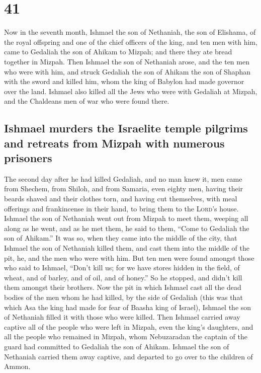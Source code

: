 \hypertarget{section-40}{%
\section{41}\label{section-40}}

 Now in the seventh month, Ishmael the son of Nethaniah,
the son of Elishama, of the royal offspring and one of the chief
officers of the king, and ten men with him, came to Gedaliah the son of
Ahikam to Mizpah; and there they ate bread together in Mizpah.
 Then Ishmael the son of Nethaniah arose, and the ten men
who were with him, and struck Gedaliah the son of Ahikam the son of
Shaphan with the sword and killed him, whom the king of Babylon had made
governor over the land.  Ishmael also killed all the Jews
who were with Gedaliah at Mizpah, and the Chaldeans men of war who were
found there.

\hypertarget{ishmael-murders-the-israelite-temple-pilgrims-and-retreats-from-mizpah-with-numerous-prisoners}{%
\subsection{Ishmael murders the Israelite temple pilgrims and retreats
from Mizpah with numerous
prisoners}\label{ishmael-murders-the-israelite-temple-pilgrims-and-retreats-from-mizpah-with-numerous-prisoners}}

 The second day after he had killed Gedaliah, and no man
knew it,  men came from Shechem, from Shiloh, and from
Samaria, even eighty men, having their beards shaved and their clothes
torn, and having cut themselves, with meal offerings and frankincense in
their hand, to bring them to the \textsc{Lord}'s house. 
Ishmael the son of Nethaniah went out from Mizpah to meet them, weeping
all along as he went, and as he met them, he said to them, ``Come to
Gedaliah the son of Ahikam.''  It was so, when they came
into the middle of the city, that Ishmael the son of Nethaniah killed
them, and cast them into the middle of the pit, he, and the men who were
with him.  But ten men were found amongst those who said
to Ishmael, ``Don't kill us; for we have stores hidden in the field, of
wheat, and of barley, and of oil, and of honey.'' So he stopped, and
didn't kill them amongst their brothers.  Now the pit in
which Ishmael cast all the dead bodies of the men whom he had killed, by
the side of Gedaliah (this was that which Asa the king had made for fear
of Baasha king of Israel), Ishmael the son of Nethaniah filled it with
those who were killed.  Then Ishmael carried away captive
all of the people who were left in Mizpah, even the king's daughters,
and all the people who remained in Mizpah, whom Nebuzaradan the captain
of the guard had committed to Gedaliah the son of Ahikam. Ishmael the
son of Nethaniah carried them away captive, and departed to go over to
the children of Ammon.

